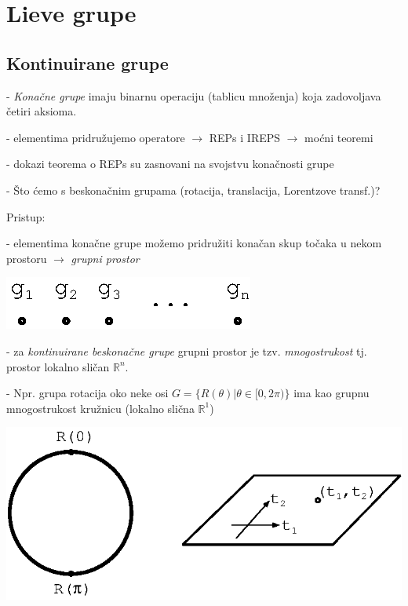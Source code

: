 
\chapter{Lieve grupe}
\label{ch:lie}

\section{Kontinuirane grupe}


- \emph{Konačne grupe} imaju binarnu operaciju (tablicu množenja)
koja zadovoljava četiri aksioma.

- elementima pridružujemo operatore $\to$ REPs i IREPS $\to$ moćni teoremi

- dokazi teorema o REPs su zasnovani na svojstvu konačnosti grupe

- Što ćemo s beskonačnim grupama (rotacija, translacija, Lorentzove transf.)?

Pristup:

- elementima konačne grupe možemo pridružiti konačan skup točaka u nekom
 prostoru $\to$ \emph{grupni prostor}

\centerline{\includegraphics[scale=1.0]{pics/grupni_prostor.eps}}

- za \emph{kontinuirane beskonačne grupe} grupni prostor je tzv.
 \emph{mnogostrukost} tj. prostor lokalno sličan $\mathbb{R}^n$.


- Npr. grupa rotacija oko neke osi $G=\{R(\theta) | \theta\in[0,2\pi)\}$
  ima kao grupnu mnogostrukost kružnicu (lokalno slična $\mathbb{R}^1$)

\centerline{\includegraphics[scale=1.0]{pics/mnogostrukost.eps}}

